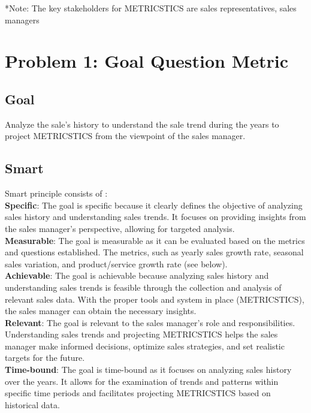 \documentclass[12pt,letterpaper]{report}
\begin{document}
*Note: The key stakeholders for METRICSTICS are sales representatives, sales managers

\chapter{Problem 1: Goal Question Metric}

\section{Goal}

Analyze the sale's history to understand the sale trend during the years to project METRICSTICS from the viewpoint of the sales manager.\\

\section{Smart}
Smart principle consists of : \\

\textbf{Specific}: The goal is specific because it clearly defines the objective of analyzing sales history and understanding sales trends. It focuses on providing insights from the sales manager's perspective, allowing for targeted analysis.\\

\textbf{Measurable}: The goal is measurable as it can be evaluated based on the metrics and questions established. The metrics, such as yearly sales growth rate, seasonal sales variation, and product/service growth rate (see below).\\

\textbf{Achievable}: The goal is achievable because analyzing sales history and understanding sales trends is feasible through the collection and analysis of relevant sales data. With the proper tools and system in place (METRICSTICS), the sales manager can obtain the necessary insights.\\

\textbf{Relevant}: The goal is relevant to the sales manager's role and responsibilities. Understanding sales trends and projecting METRICSTICS helps the sales manager make informed decisions, optimize sales strategies, and set realistic targets for the future.\\

\textbf{Time-bound}: The goal is time-bound as it focuses on analyzing sales history over the years. It allows for the examination of trends and patterns within specific time periods and facilitates projecting METRICSTICS based on historical data.\\
\end{document}
